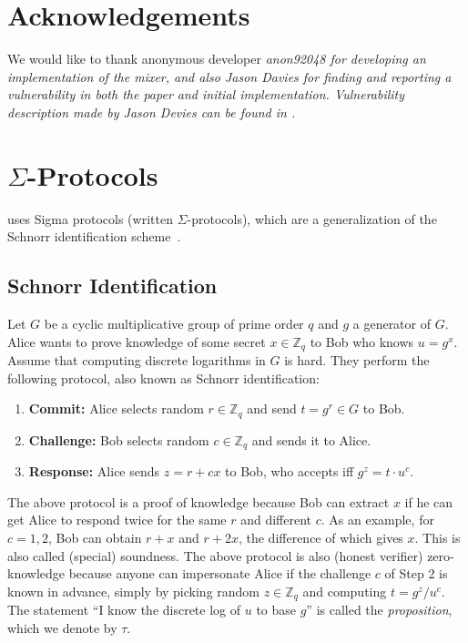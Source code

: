 \documentclass[runningheads]{llncs}
\begin{document}
\section*{Acknowledgements}

We would like to thank anonymous developer \em{anon92048} for developing an implementation of the mixer, and also Jason Davies
for finding and reporting a vulnerability in both the paper and initial implementation. Vulnerability description made by Jason Devies
can be found in \cite{ergomix-vuln}.



\appendix

\section{$\Sigma$-Protocols}
\label{intro:sigma}
\algname uses Sigma protocols (written $\Sigma$-protocols), which are a generalization of the Schnorr identification scheme~\cite{Sch91}. 

\subsection{Schnorr Identification}
 Let $G$ be a cyclic multiplicative group of prime order $q$ and $g$ a generator of $G$. Alice wants to prove knowledge of some secret $x\in \mathbb{Z}_q$ to Bob who knows $u = g^x$. Assume that computing discrete logarithms in $G$ is hard. They perform the following protocol, also known as Schnorr identification:

\begin{enumerate}
	\item \textbf{Commit:} Alice selects random $r\in \mathbb{Z}_q$ and send $t = g^r\in G$ to Bob.
	\item \textbf{Challenge:} Bob selects random $c\in\mathbb{Z}_q$ and sends it to Alice.
	\item \textbf{Response:} Alice sends $z = r + cx$ to Bob, who accepts iff $g^z = t\cdot u^c$.
\end{enumerate}

The above protocol is a proof of knowledge because Bob can extract $x$ if he can get Alice to respond twice for the same $r$ and different $c$. As an example, for $c = 1, 2$, Bob can obtain $r+x$ and $r+2x$, the difference of which gives $x$. This is also called (special) soundness. The above protocol is also (honest verifier) zero-knowledge because anyone can impersonate Alice if the challenge $c$ of Step 2 is known in advance, simply by picking random $z \in\mathbb{Z}_q$ and computing $t = g^z/u^c$. The statement ``I know the discrete log of $u$ to base $g$'' is called the {\em proposition}, which we denote by $\tau$.
\end{document}

